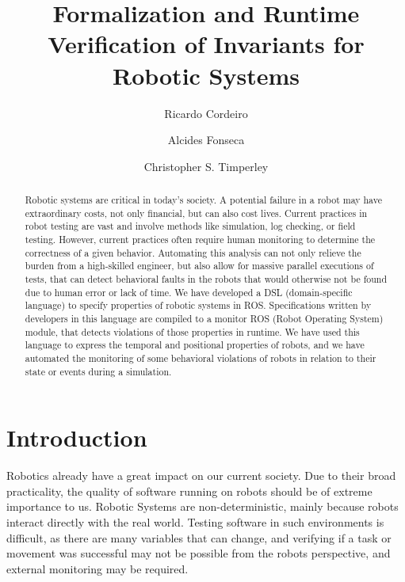 \documentclass[runningheads]{llncs}
\begin{document}
%
\title{Formalization and Runtime Verification of Invariants for
Robotic Systems}
%
%
\author{Ricardo Cordeiro \and
Alcides Fonseca \and
Christopher S. Timperley}
%
%
%
\maketitle              %
%
\begin{abstract}
    Robotic systems are critical in today's society. A potential failure in a robot may have extraordinary costs, not only financial, but can also cost lives.
    Current practices in robot testing are vast and involve methods like simulation, log checking, or field testing. However, current practices often require human monitoring to determine the correctness of a given behavior. Automating this analysis can not only relieve the burden from a high-skilled engineer, but also allow for massive parallel executions of tests, that can detect behavioral faults in the robots that would otherwise not be found due to human error or lack of time.
    We have developed a DSL (domain-specific language) to specify properties of robotic systems in ROS. Specifications written by developers in this language are compiled to a monitor ROS (Robot Operating System) module, that detects violations of those properties in runtime. We have used this language to express the temporal and positional properties of robots, and we have automated the monitoring of some behavioral violations of robots in relation to their state or events during a simulation.

\end{abstract}
%
%
%
\section{Introduction}

Robotics already have a great impact on our current society. Due to their broad practicality, the quality of software running on robots should be of extreme importance to us. Robotic Systems are non-deterministic, mainly because robots interact directly with the real world. Testing software in such environments is difficult, as there are many variables that can change, and verifying if a task or movement was successful may not be possible from the robots perspective, and external monitoring may be required.
\end{document}
